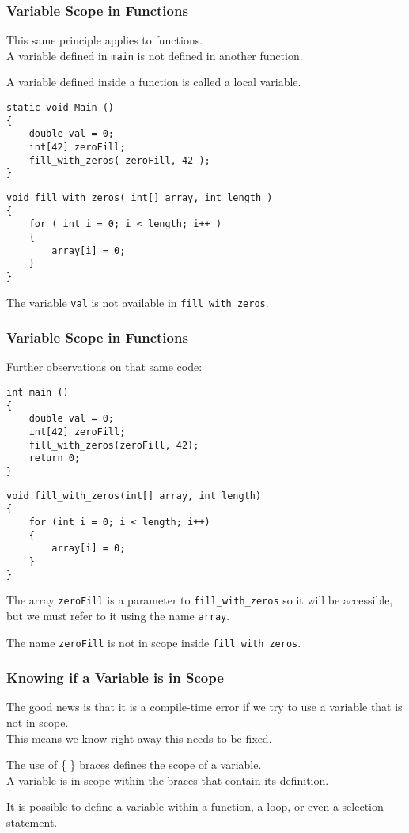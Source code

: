 \begin{frame}[fragile]
\frametitle{Variable Scope in Functions}
This same principle applies to functions.\\
\quad A variable defined in \texttt{main} is not defined in another function.

A variable defined inside a function is called a \alert{local variable}.

{\scriptsize
\begin{verbatim}
static void Main ()
{
    double val = 0;
    int[42] zeroFill;
    fill_with_zeros( zeroFill, 42 );
}
\end{verbatim}
}

{\scriptsize
\begin{verbatim}
void fill_with_zeros( int[] array, int length ) 
{
    for ( int i = 0; i < length; i++ )
    {
        array[i] = 0;
    }
}    
\end{verbatim}
}

The variable \texttt{val} is not available in \texttt{fill\_with\_zeros}.

\end{frame}

\begin{frame}[fragile]
\frametitle{Variable Scope in Functions}
Further observations on that same code:

{\scriptsize
\begin{verbatim}
int main ()
{
    double val = 0;
    int[42] zeroFill;
    fill_with_zeros(zeroFill, 42);
    return 0;
}
\end{verbatim}
}

{\scriptsize
\begin{verbatim}
void fill_with_zeros(int[] array, int length) 
{
    for (int i = 0; i < length; i++)
    {
        array[i] = 0;
    }
}    
\end{verbatim}
}


The array \texttt{zeroFill} is a parameter to \texttt{fill\_with\_zeros} so it will be accessible, but we must refer to it using the name \texttt{array}.

The name \texttt{zeroFill} is not in scope inside \texttt{fill\_with\_zeros}.

\end{frame}

\begin{frame}
\frametitle{Knowing if a Variable is in Scope}
The good news is that it is a compile-time error if we try to use a variable that is not in scope.\\
\quad This means we know right away this needs to be fixed.

The use of \{ \} braces defines the scope of a variable.\\
\quad A variable is in scope within the braces that contain its definition.

It is possible to define a variable within a function, a loop, or even a selection statement. 

\end{frame}


